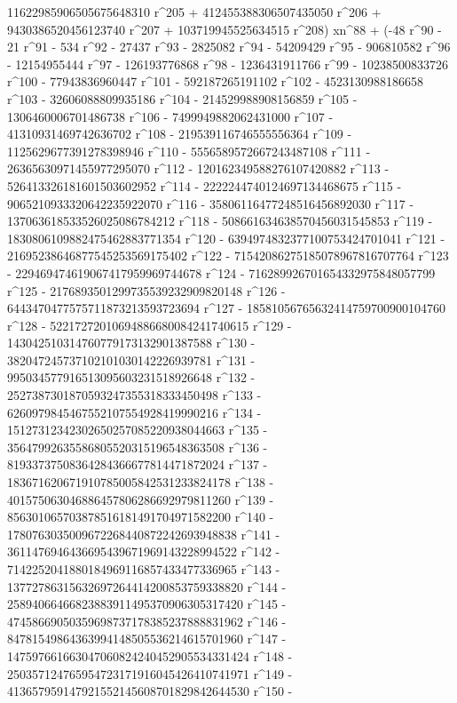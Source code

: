        11622985906505675648310 r^205 + 412455388306507435050 r^206 + 
       9430386520456123740 r^207 + 
       103719945525634515 r^208) xn^88 + (-48 r^90 - 21 r^91 - 
       534 r^92 - 27437 r^93 - 2825082 r^94 - 54209429 r^95 - 
       906810582 r^96 - 12154955444 r^97 - 126193776868 r^98 - 
       1236431911766 r^99 - 10238500833726 r^100 - 
       77943836960447 r^101 - 592187265191102 r^102 - 
       4523130988186658 r^103 - 32606088809935186 r^104 - 
       214529988908156859 r^105 - 1306460006701486738 r^106 - 
       7499949882062431000 r^107 - 41310931469742636702 r^108 - 
       219539116746555556364 r^109 - 1125629677391278398946 r^110 - 
       5556589572667243487108 r^111 - 26365630971455977295070 r^112 - 
       120162349588276107420882 r^113 - 
       526413326181601503602952 r^114 - 
       2222244740124697134468675 r^115 - 
       9065210933320642235922070 r^116 - 
       35806116477248516456892030 r^117 - 
       137063618533526025086784212 r^118 - 
       508661634638570456031545853 r^119 - 
       1830806109882475462883771354 r^120 - 
       6394974832377100753424701041 r^121 - 
       21695238646877545253569175402 r^122 - 
       71542086275185078967816707764 r^123 - 
       229469474619067417959969744678 r^124 - 
       716289926701654332975848057799 r^125 - 
       2176893501299735539232909820148 r^126 - 
       6443470477575711873213593723694 r^127 - 
       18581056765632414759700900104760 r^128 - 
       52217272010694886680084241740615 r^129 - 
       143042510314760779173132901387588 r^130 - 
       382047245737102101030142226939781 r^131 - 
       995034577916513095603231518926648 r^132 - 
       2527387301870593247355318333450498 r^133 - 
       6260979845467552107554928419990216 r^134 - 
       15127312342302650257085220938044663 r^135 - 
       35647992635586805520315196548363508 r^136 - 
       81933737508364284366677814471872024 r^137 - 
       183671620671910785005842531233824178 r^138 - 
       401575063046886457806286692979811260 r^139 - 
       856301065703878516181491704971582200 r^140 - 
       1780763035009672268440872242693948838 r^141 - 
       3611476946436695439671969143228994522 r^142 - 
       7142252041880184969116857433477336965 r^143 - 
       13772786315632697264414200853759338820 r^144 - 
       25894066466823883911495370906305317420 r^145 - 
       47458669050359698737178385237888831962 r^146 - 
       84781549864363994148505536214615701960 r^147 - 
       147597661663047060824240452905534331424 r^148 - 
       250357124765954723171916045426410741971 r^149 - 
       413657959147921552145608701829842644530 r^150 - 
